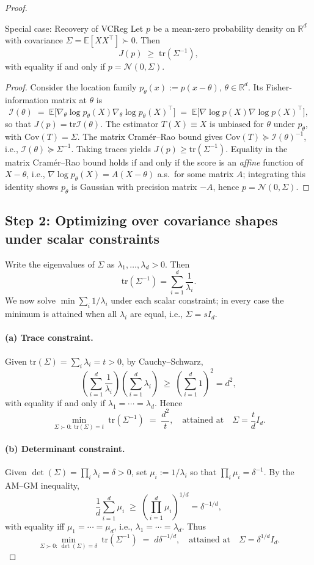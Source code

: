 \begin{proof}
\begin{lemma}[label={lem:fixed-Sigma}]{Special case: Recovery of VCReg}{}
Let $p$ be a mean-zero probability density on $\mathbb{R}^d$ with covariance $\Sigma=\mathbb{E}[X X^\top]\succ 0$. Then
\[
J(p)\;\ge\;\mathrm{tr}(\Sigma^{-1}),
\]
with equality if and only if $p=\mathcal{N}(0,\Sigma)$.
\end{lemma}
\begin{proof}
Consider the location family $p_\theta(x):=p(x-\theta)$, $\theta\in\mathbb{R}^d$. Its Fisher-information matrix at $\theta$ is
\[
\mathcal{I}(\theta)
\;=\;
\mathbb{E}\big[\nabla_\theta\log p_\theta(X)\nabla_\theta\log p_\theta(X)^\top\big]
\;=\;
\mathbb{E}\big[\nabla\log p(X)\nabla\log p(X)^\top\big],
\]
so that $J(p)=\mathrm{tr}\mathcal{I}(\theta)$. The estimator $T(X)\equiv X$ is unbiased for $\theta$ under $p_\theta$, with $\mathrm{Cov}(T)=\Sigma$. The matrix Cramér--Rao bound gives $\mathrm{Cov}(T)\succeq \mathcal{I}(\theta)^{-1}$, i.e., $\mathcal{I}(\theta)\succeq \Sigma^{-1}$. Taking traces yields $J(p)\ge \mathrm{tr}(\Sigma^{-1})$.
Equality in the matrix Cramér--Rao bound holds if and only if the score is an \emph{affine} function of $X-\theta$, i.e., $\nabla\log p_\theta(X)=A(X-\theta)$ a.s.\ for some matrix $A$; integrating this identity shows $p_\theta$ is Gaussian with precision matrix $-A$, hence $p=\mathcal{N}(0,\Sigma)$.
\end{proof}
\subsection*{Step 2: Optimizing over covariance shapes under scalar constraints}
Write the eigenvalues of $\Sigma$ as $\lambda_1,\ldots,\lambda_d>0$. Then
\[
\mathrm{tr}(\Sigma^{-1})=\sum_{i=1}^d \frac{1}{\lambda_i}.
\]
We now solve $\min \sum_i 1/\lambda_i$ under each scalar constraint; in every case the minimum is attained when all $\lambda_i$ are equal, i.e., $\Sigma=sI_d$.
\paragraph{(a) Trace constraint.}
Given $\mathrm{tr}(\Sigma)=\sum_i \lambda_i=t>0$, by Cauchy--Schwarz,
\[
\left(\sum_{i=1}^d \frac{1}{\lambda_i}\right)\left(\sum_{i=1}^d \lambda_i\right)\;\ge\;\left(\sum_{i=1}^d 1\right)^2=d^2,
\]
with equality if and only if $\lambda_1=\cdots=\lambda_d$. Hence
\[
\min_{\Sigma\succ 0:\ \mathrm{tr}(\Sigma)=t}\ \mathrm{tr}(\Sigma^{-1})
\;=\;\frac{d^2}{t},
\quad\text{attained at}\quad
\Sigma=\frac{t}{d}I_d.
\]
\paragraph{(b) Determinant constraint.}
Given $\det(\Sigma)=\prod_i \lambda_i=\delta>0$, set $\mu_i:=1/\lambda_i$ so that $\prod_i \mu_i=\delta^{-1}$. By the AM--GM inequality,
\[
\frac{1}{d}\sum_{i=1}^d \mu_i\;\ge\;\left(\prod_{i=1}^d \mu_i\right)^{1/d}=\delta^{-1/d},
\]
with equality iff $\mu_1=\cdots=\mu_d$, i.e., $\lambda_1=\cdots=\lambda_d$. Thus
\[
\min_{\Sigma\succ 0:\ \det(\Sigma)=\delta}\ \mathrm{tr}(\Sigma^{-1})
\;=\;d\delta^{-1/d},
\quad\text{attained at}\quad
\Sigma=\delta^{1/d}I_d.
\]

\end{proof}
